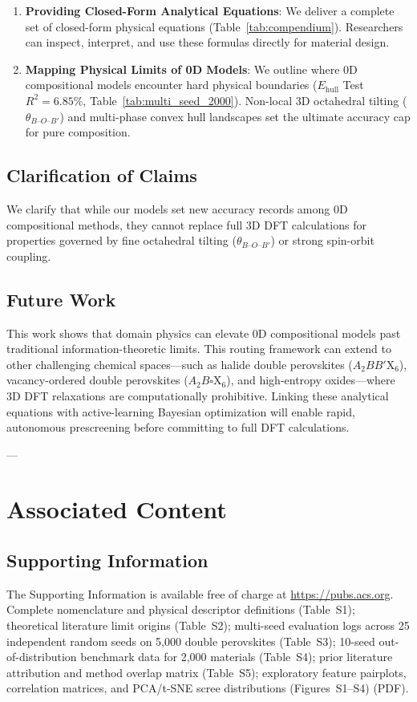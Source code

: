\documentclass[journal=jcisd8,manuscript=article]{achemso}
\begin{document}
\begin{enumerate}
\item \textbf{Providing Closed-Form Analytical Equations}: We deliver a complete set of closed-form physical equations (Table~\ref{tab:compendium}). Researchers can inspect, interpret, and use these formulas directly for material design.

\item \textbf{Mapping Physical Limits of 0D Models}: We outline where 0D compositional models encounter hard physical boundaries ($E_{\text{hull}}$ Test $R^2 = 6.85\%$, Table~\ref{tab:multi_seed_2000}). Non-local 3D octahedral tilting ($\theta_{B\text{--}O\text{--}B'}$) and multi-phase convex hull landscapes set the ultimate accuracy cap for pure composition.
\end{enumerate}

\subsection{Clarification of Claims}
We clarify that while our models set new accuracy records among 0D compositional methods, they cannot replace full 3D DFT calculations for properties governed by fine octahedral tilting ($\theta_{B\text{--}O\text{--}B'}$) or strong spin-orbit coupling.

\subsection{Future Work}
This work shows that domain physics can elevate 0D compositional models past traditional information-theoretic limits. This routing framework can extend to other challenging chemical spaces—such as halide double perovskites ($A_2BB'\text{X}_6$), vacancy-ordered double perovskites ($A_2B\square\text{X}_6$), and high-entropy oxides—where 3D DFT relaxations are computationally prohibitive. Linking these analytical equations with active-learning Bayesian optimization will enable rapid, autonomous prescreening before committing to full DFT calculations.

---

\section{Associated Content}
\subsection*{Supporting Information}
The Supporting Information is available free of charge at \url{https://pubs.acs.org}.
Complete nomenclature and physical descriptor definitions (Table~S1); theoretical literature limit origins (Table~S2); multi-seed evaluation logs across 25 independent random seeds on 5,000 double perovskites (Table~S3); 10-seed out-of-distribution benchmark data for 2,000 materials (Table~S4); prior literature attribution and method overlap matrix (Table~S5); exploratory feature pairplots, correlation matrices, and PCA/t-SNE scree distributions (Figures~S1--S4) (PDF).
\end{document}
